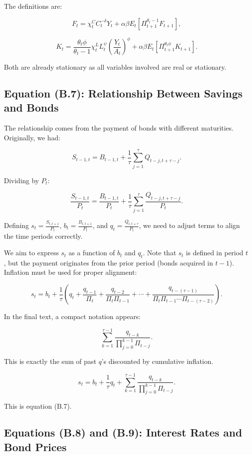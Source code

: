 \documentclass[12pt]{article}
\begin{document}
The definitions are:

\[
F_t = \chi_t^C C_t^{-\delta} Y_t + \alpha \beta E_t[\Pi_{t+1}^{\theta_t -1} F_{t+1}],
\]

\[
K_t = \frac{\theta_t \phi}{\theta_t -1}\chi_t^L L_t^\psi \left(\frac{Y_t}{A_t}\right)^\phi + \alpha \beta E_t[\Pi_{t+1}^{\theta_t \phi} K_{t+1}].
\]

Both are already stationary as all variables involved are real or stationary.


\subsection{Equation (B.7): Relationship Between Savings and Bonds}

The relationship comes from the payment of bonds with different maturities. Originally, we had:

\[
S_{t-1,t} = B_{t-1,t} + \frac{1}{\tau} \sum_{j=1}^\tau Q_{t-j,t+\tau-j}.
\]

Dividing by \(P_t\):

\[
\frac{S_{t-1,t}}{P_t} = \frac{B_{t-1,t}}{P_t} + \frac{1}{\tau} \sum_{j=1}^\tau \frac{Q_{t-j,t+\tau-j}}{P_t}.
\]

Defining \(s_t = \frac{S_{t,t+1}}{P_t}\), \(b_t = \frac{B_{t,t+1}}{P_t}\), and \(q_t = \frac{Q_{t,t+\tau}}{P_t}\), we need to adjust terms to align the time periods correctly.

We aim to express \(s_t\) as a function of \(b_t\) and \(q_t\). Note that \(s_t\) is defined in period \(t\), but the payment originates from the prior period (bonds acquired in \(t-1\)). Inflation must be used for proper alignment:

\[
s_t = b_t + \frac{1}{\tau} \left(q_t + \frac{q_{t-1}}{\Pi_t} + \frac{q_{t-2}}{\Pi_t \Pi_{t-1}} + \cdots + \frac{q_{t-(\tau-1)}}{\Pi_t \Pi_{t-1} \cdots \Pi_{t-(\tau-2)}}\right).
\]

In the final text, a compact notation appears:

\[
\sum_{k=1}^{\tau-1} \frac{q_{t-k}}{\prod_{j=0}^{k-1} \Pi_{t-j}}.
\]

This is exactly the sum of past \(q\)'s discounted by cumulative inflation.

\[
s_t = b_t + \frac{1}{\tau} q_t + \sum_{k=1}^{\tau-1} \frac{q_{t-k}}{\prod_{j=0}^{k-1} \Pi_{t-j}}.
\]

This is equation (B.7).


\subsection{Equations (B.8) and (B.9): Interest Rates and Bond Prices}
\end{document}
